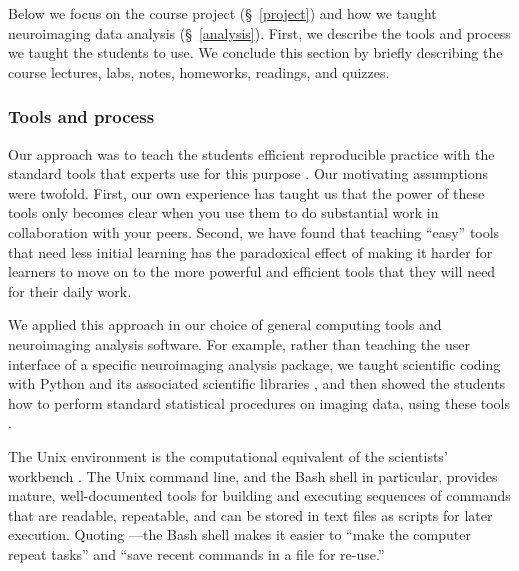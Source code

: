 Below we focus on the course project (\S~\ref{project}) and
how we taught neuroimaging data analysis (\S~\ref{analysis}).
First, we describe the tools and process we taught the students to use.
We conclude this section by briefly describing the course
lectures, labs, notes, homeworks, readings, and quizzes.

\subsubsection{Tools and process}

Our approach was to teach the students efficient reproducible practice with
the standard tools that experts use for this purpose
\citep{millman2014developing}. Our motivating assumptions were twofold.
First, our own experience has taught us that the power of these tools only
becomes clear when you use them to do substantial work in collaboration with
your peers.  Second, we have found that teaching ``easy'' tools that need less
initial learning has the paradoxical effect of making it harder for learners
to move on to the more powerful and efficient tools that they will need for
their daily work.

We applied this approach in our choice of general computing tools and
neuroimaging analysis software.   For example, rather than teaching the user
interface of a specific neuroimaging analysis package, we taught scientific
coding with Python and its associated scientific libraries
\citep{millman2011python, perez2011python}, and then showed the students how to
perform standard statistical procedures on imaging data, using these tools
\citep{millman2007analysis}.


The Unix environment is the computational equivalent of the scientists'
workbench \citep{preeyanon2014reproducible}.  The Unix command line, and the
Bash shell in particular, provides mature, well-documented tools for building
and executing sequences of commands that are readable, repeatable, and can be
stored in text files as scripts for later execution.  Quoting
\cite{wilson2014best}---the Bash shell makes it easier to ``make the computer
repeat tasks'' and ``save recent commands in a file for re-use.''

